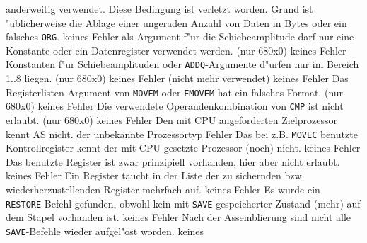 \documentclass[12pt,a4paper,twoside]{report}
\newcommand{\tty}[1]{{\tt #1}}
\begin{document}
\begin{description}
{                anderweitig verwendet.  Diese Bedingung ist verletzt
                worden.  Grund ist "ublicherweise die Ablage einer
                ungeraden Anzahl von Daten in Bytes oder ein falsches \tty{ORG}.}
               {keines}
               {Fehler}
               {als Argument f"ur die Schiebeamplitude darf nur
                eine Konstante oder ein Datenregister verwendet werden.
                (nur 680x0)}
               {keines}
               {Fehler}
               {Konstanten f"ur Schiebeamplituden oder
                \tty{ADDQ}-Argumente d"urfen nur im Bereich 1..8 liegen. (nur
                680x0)}
               {keines}
               {Fehler}
               {(nicht mehr verwendet)}
               {keines}
               {Fehler}
               {Das Registerlisten-Argument von \tty{MOVEM}
	        oder \tty{FMOVEM} hat ein falsches Format. (nur 680x0)}
               {keines}
               {Fehler}
               {Die verwendete Operandenkombination von \tty{CMP}
	        ist nicht erlaubt. (nur 680x0)}
               {keines}
               {Fehler}
               {Den mit CPU angeforderten Zielprozessor kennt AS
                nicht.}
               {der unbekannte Prozessortyp}
               {Fehler}
               {Das bei z.B. \tty{MOVEC} benutzte
	        Kontrollregister  kennt der mit CPU gesetzte Prozessor
	        (noch) nicht.}
               {keines}
               {Fehler}
               {Das benutzte Register ist zwar prinzipiell
                vorhanden, hier aber nicht erlaubt.}
               {keines}
               {Fehler}
               {Ein Register taucht in der Liste der zu sichernden bzw.
                wiederherzustellenden Register mehrfach auf.}
               {keines}
               {Fehler}
               {Es wurde ein \tty{RESTORE}-Befehl gefunden, obwohl
                kein mit \tty{SAVE} gespeicherter Zustand (mehr) auf dem Stapel
                vorhanden ist.}
               {keines}
               {Fehler}
               {Nach der Assemblierung sind nicht alle
                \tty{SAVE}-Befehle wieder aufgel"ost worden.}
               {keines}

\end{description}
\end{document}
